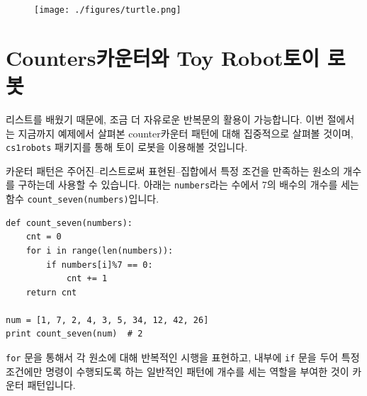 \documentclass[../main.tex]{subfiles}
\begin{document}
\begin{figure}[H]
  \centering
  \texttt{[image: ./figures/turtle.png]}
\end{figure}

\section{Counters카운터와 Toy Robot토이 로봇}
리스트를 배웠기 때문에, 조금 더 자유로운 반복문의 활용이 가능합니다.
이번 절에서는 지금까지 예제에서 살펴본 counter카운터 패턴에 대해 집중적으로 살펴볼 것이며, \texttt{cs1robots} 패키지를 통해 토이 로봇을 이용해볼 것입니다.

카운터 패턴은 주어진--리스트로써 표현된--집합에서 특정 조건을 만족하는 원소의 개수를 구하는데 사용할 수 있습니다.
아래는 \texttt{numbers}라는 수에서 7의 배수의 개수를 세는 함수 \texttt{count\_seven(numbers)}입니다.
\begin{verbatim}
def count_seven(numbers):
    cnt = 0
    for i in range(len(numbers)):
        if numbers[i]%7 == 0:
            cnt += 1
    return cnt

num = [1, 7, 2, 4, 3, 5, 34, 12, 42, 26]
print count_seven(num)  # 2
\end{verbatim}
\texttt{for} 문을 통해서 각 원소에 대해 반복적인 시행을 표현하고, 내부에 \texttt{if} 문을 두어 특정 조건에만 명령이 수행되도록 하는 일반적인 패턴에 개수를 세는 역할을 부여한 것이 카운터 패턴입니다.
\end{document}
